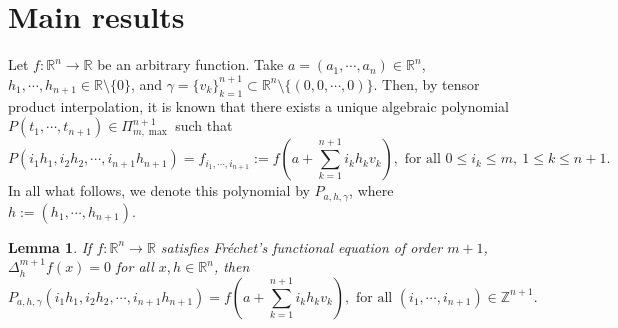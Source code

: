 \documentclass[10pt,a4paper]{amsart}
\newtheorem{lemma}[theorem]{Lemma}
\theoremstyle{definition}
\begin{document}
\section{Main results}

Let  $f:\mathbb{R}^n\to\mathbb{R}$ be an arbitrary function. Take $a=(a_1,\cdots,a_n)\in\mathbb{R}^n$, $h_1,\cdots, h_{n+1}\in\mathbb{R}\setminus\{0\}$, and $\gamma=\{v_k\}_{k=1}^{n+1}\subset \mathbb{R}^n\setminus \{(0,0,\cdots,0)\}$. Then, by tensor product interpolation, it is known that there exists a unique  algebraic polynomial $P(t_1,\cdots,t_{n+1})\in \Pi_{m,\max}^{n+1}$ such that 
\[
P(i_1h_1,i_2h_2,\cdots,i_{n+1}h_{n+1})=f_{i_1,\cdots,i_{n+1}}:=f(a+\sum_{k=1}^{n+1}i_kh_kv_k), \text{ for all } 0\leq i_k\leq m,\ 1\leq k\leq n+1.
\] 
In all what follows, we denote this polynomial  by  $P_{a,h,\gamma}$, where $h:=(h_1,\cdots,h_{n+1})$.  

 
\begin{lemma} \label{MP_lem1} If $f:\mathbb{R}^n\to\mathbb{R}$ satisfies Fr\'{e}chet's functional equation of order $m+1$, 
$\Delta_h^{m+1}f(x)=0 $  for all $x,h \in\mathbb{R}^n$,  then  
\[
P_{a,h,\gamma}(i_1h_1,i_2h_2,\cdots,i_{n+1}h_{n+1})=f(a+\sum_{k=1}^{n+1}i_kh_kv_k), \text{ for all  } (i_1,\cdots,i_{n+1})\in\mathbb{Z}^{n+1}.
\]
\end{lemma}
\end{document}
